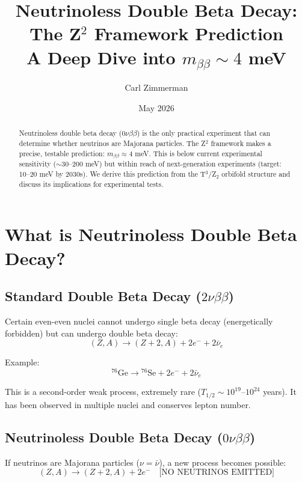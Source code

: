 \documentclass[12pt,a4paper]{article}
\title{\textbf{Neutrinoless Double Beta Decay: The Z$^2$ Framework Prediction}\\[0.5em]
\large A Deep Dive into $m_{\beta\beta} \sim 4$ meV}
\author{Carl Zimmerman}
\date{May 2026}
\begin{document}
\maketitle

\begin{abstract}
Neutrinoless double beta decay ($0\nu\beta\beta$) is the only practical experiment that can determine whether neutrinos are Majorana particles. The Z$^2$ framework makes a precise, testable prediction: $m_{\beta\beta} \approx 4$ meV. This is below current experimental sensitivity ($\sim$30--200 meV) but within reach of next-generation experiments (target: 10--20 meV by 2030s). We derive this prediction from the T$^3$/Z$_2$ orbifold structure and discuss its implications for experimental tests.
\end{abstract}

\tableofcontents
\newpage

\section{What is Neutrinoless Double Beta Decay?}

\subsection{Standard Double Beta Decay ($2\nu\beta\beta$)}

Certain even-even nuclei cannot undergo single beta decay (energetically forbidden) but can undergo double beta decay:
\begin{equation}
(Z, A) \rightarrow (Z+2, A) + 2e^- + 2\bar{\nu}_e
\end{equation}

Example:
\begin{equation}
{}^{76}\text{Ge} \rightarrow {}^{76}\text{Se} + 2e^- + 2\bar{\nu}_e
\end{equation}

This is a second-order weak process, extremely rare ($T_{1/2} \sim 10^{19}$--$10^{24}$ years). It has been observed in multiple nuclei and conserves lepton number.

\subsection{Neutrinoless Double Beta Decay ($0\nu\beta\beta$)}

If neutrinos are Majorana particles ($\nu = \bar{\nu}$), a new process becomes possible:
\begin{equation}
(Z, A) \rightarrow (Z+2, A) + 2e^- \quad \text{[NO NEUTRINOS EMITTED]}
\end{equation}
\end{document}
